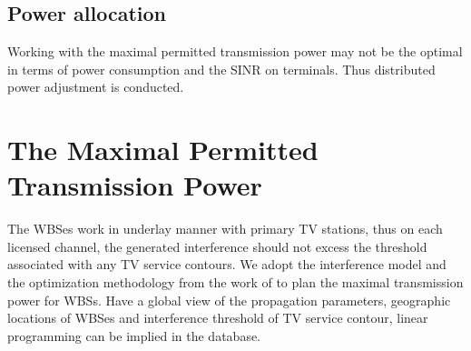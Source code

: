 \subsection{Power allocation}
\label{PA}
Working with the maximal permitted transmission power may not be the optimal in terms of power consumption and the SINR on terminals.
Thus distributed power adjustment is conducted.




%
%




\section{The Maximal Permitted Transmission Power}
\label{powermap}
The WBSes work in underlay manner with primary TV stations, thus on each licensed channel, the generated interference should not excess the threshold associated with any TV service contours.
We adopt the interference model and the optimization methodology from the work of \cite{multipleIntf_pimrc11} to plan the maximal transmission power for WBSs.
Have a global view of the propagation parameters, geographic locations of WBSes and interference threshold of TV service contour, linear programming can be implied in the database.

